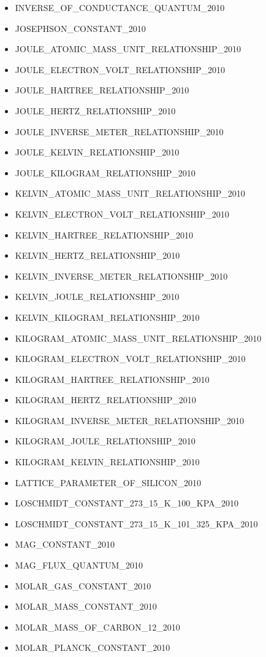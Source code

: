 \begin{itemize}
\item INVERSE\_OF\_CONDUCTANCE\_QUANTUM\_2010
\item JOSEPHSON\_CONSTANT\_2010
\item JOULE\_ATOMIC\_MASS\_UNIT\_RELATIONSHIP\_2010
\item JOULE\_ELECTRON\_VOLT\_RELATIONSHIP\_2010
\item JOULE\_HARTREE\_RELATIONSHIP\_2010
\item JOULE\_HERTZ\_RELATIONSHIP\_2010
\item JOULE\_INVERSE\_METER\_RELATIONSHIP\_2010
\item JOULE\_KELVIN\_RELATIONSHIP\_2010
\item JOULE\_KILOGRAM\_RELATIONSHIP\_2010
\item KELVIN\_ATOMIC\_MASS\_UNIT\_RELATIONSHIP\_2010
\item KELVIN\_ELECTRON\_VOLT\_RELATIONSHIP\_2010
\item KELVIN\_HARTREE\_RELATIONSHIP\_2010
\item KELVIN\_HERTZ\_RELATIONSHIP\_2010
\item KELVIN\_INVERSE\_METER\_RELATIONSHIP\_2010
\item KELVIN\_JOULE\_RELATIONSHIP\_2010
\item KELVIN\_KILOGRAM\_RELATIONSHIP\_2010
\item KILOGRAM\_ATOMIC\_MASS\_UNIT\_RELATIONSHIP\_2010
\item KILOGRAM\_ELECTRON\_VOLT\_RELATIONSHIP\_2010
\item KILOGRAM\_HARTREE\_RELATIONSHIP\_2010
\item KILOGRAM\_HERTZ\_RELATIONSHIP\_2010
\item KILOGRAM\_INVERSE\_METER\_RELATIONSHIP\_2010
\item KILOGRAM\_JOULE\_RELATIONSHIP\_2010
\item KILOGRAM\_KELVIN\_RELATIONSHIP\_2010
\item LATTICE\_PARAMETER\_OF\_SILICON\_2010
\item LOSCHMIDT\_CONSTANT\_273\_15\_K\_100\_KPA\_2010
\item LOSCHMIDT\_CONSTANT\_273\_15\_K\_101\_325\_KPA\_2010
\item MAG\_CONSTANT\_2010
\item MAG\_FLUX\_QUANTUM\_2010
\item MOLAR\_GAS\_CONSTANT\_2010
\item MOLAR\_MASS\_CONSTANT\_2010
\item MOLAR\_MASS\_OF\_CARBON\_12\_2010
\item MOLAR\_PLANCK\_CONSTANT\_2010

\end{itemize}
